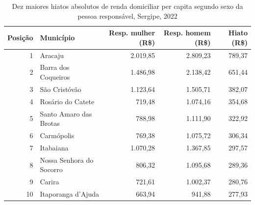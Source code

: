 \begin{table}[htbp]
\centering
\caption{Dez maiores hiatos absolutos de renda domiciliar per capita segundo sexo da pessoa responsável, Sergipe, 2022}
\label{tab:item2-4-maiores-hiatos-rdpc}
\small
\begin{tabular}{rlrrr}
\toprule
Posição & Município & Resp. mulher (R\$) & Resp. homem (R\$) & Hiato (R\$) \\
\midrule
1 & Aracaju & 2.019,85 & 2.809,23 & 789,37 \\
2 & Barra dos Coqueiros & 1.486,98 & 2.138,42 & 651,44 \\
3 & São Cristóvão & 1.123,64 & 1.505,71 & 382,07 \\
4 & Rosário do Catete & 719,48 & 1.074,16 & 354,68 \\
5 & Santo Amaro das Brotas & 788,98 & 1.111,90 & 322,92 \\
6 & Carmópolis & 769,38 & 1.075,72 & 306,34 \\
7 & Itabaiana & 1.070,28 & 1.367,85 & 297,57 \\
8 & Nossa Senhora do Socorro & 806,32 & 1.095,68 & 289,36 \\
9 & Carira & 721,61 & 1.002,37 & 280,76 \\
10 & Itaporanga d'Ajuda & 663,94 & 941,88 & 277,93 \\
\bottomrule
\end{tabular}
\end{table}
